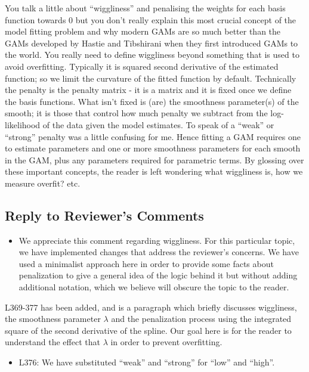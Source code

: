 \documentclass[
]{article}
\providecommand{\tightlist}{%
  \setlength{\itemsep}{0pt}\setlength{\parskip}{0pt}}
\begin{document}
You talk a little about ``wiggliness'' and penalising the weights for each basis function towards 0 but you don't really explain this most crucial concept of the model fitting problem and why modern GAMs are so much better than the GAMs developed by Hastie and Tibshirani when they first introduced GAMs to the world.
You really need to define wiggliness beyond something that is used to avoid overfitting. Typically it is squared second derivative of the estimated function; so we limit the curvature of the fitted function by default. Technically the penalty is the penalty matrix - it is a matrix and it is fixed once we define the basis functions. What isn't fixed is (are) the smoothness parameter(s) of the smooth; it is those that control how much penalty we subtract from the log-likelihood of the data given the model estimates. To speak of a ``weak'' or ``strong'' penalty was a little confusing for me.
Hence fitting a GAM requires one to estimate parameters and one or more smoothness parameters for each smooth in the GAM, plus any parameters required for parametric terms.
By glossing over these important concepts, the reader is left wondering what wiggliness is, how we measure overfit? etc.

\hypertarget{section-6}{%
\subsection{\texorpdfstring{\textcolor{reviewersblue} {Reply to Reviewer's Comments}}{}}\label{section-6}}

\begin{itemize}
\tightlist
\item
  We appreciate this comment regarding wiggliness. For this particular topic, we have implemented changes that address the reviewer's concerns. We have used a minimalist approach here in order to provide some facts about penalization to give a general idea of the logic behind it but without adding additional notation, which we believe will obscure the topic to the reader.
\end{itemize}

L369-377 has been added, and is a paragraph which briefly discusses wiggliness, the smoothness parameter \(\lambda\) and the penalization process using the integrated square of the second derivative of the spline. Our goal here is for the reader to understand the effect that \(\lambda\) in order to prevent overfitting.

\begin{itemize}
\tightlist
\item
  L376: We have substituted ``weak'' and ``strong'' for ``low'' and ``high''.
\end{itemize}
\end{document}
